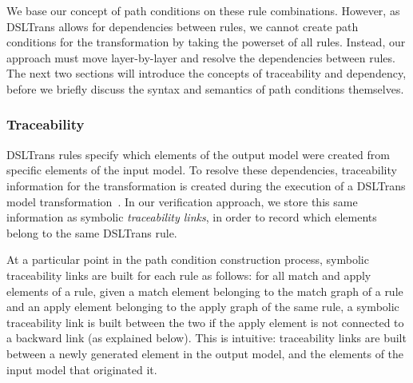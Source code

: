 We base our concept of path conditions on these rule combinations. However, as
DSLTrans allows for dependencies between rules, we cannot create path conditions
for the transformation by taking the powerset of all rules. Instead, our
approach must move layer-by-layer and resolve the dependencies between rules.
The next two sections will introduce the concepts of traceability and dependency, before we
briefly discuss the syntax and semantics of path conditions themselves.

\subsubsection{Traceability}
\label{subsubsec:traceability}

DSLTrans rules specify which elements of the
output model were created from specific elements of the input model. To resolve
these dependencies, traceability information for the transformation is created
during the execution of a DSLTrans model transformation~\cite{DBLP:conf/sle/BarrocaLAFS10}.
In our verification approach, we store this same information as symbolic \emph{traceability links}, in
order to record which elements belong to the same DSLTrans rule.


At a particular point in the path condition construction process, symbolic traceability links are built for
each rule as follows: for all match and apply elements of a rule, given a match
element belonging to the match graph of a rule and an apply element belonging to
the apply graph of the same rule, a symbolic traceability link is built between the two
if the apply element is not connected to a backward link (as explained below).
This is intuitive: traceability links are built between a newly generated
element in the output model, and the elements of the input model that originated
it.

